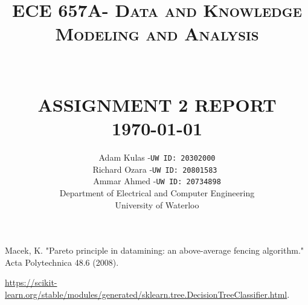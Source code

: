 \documentclass[ fontsize=11pt,twoside]{scrartcl}	%
\title{	\Large \textsc{ ECE 657A- Data and Knowledge Modeling and Analysis \\ } 
		 	\\[1.0cm]								%
			\HRule{2pt} \\					    	%
			\LARGE \textbf{\uppercase{Assignment 2 Report}}	%
			\HRule{2pt} \\ [0.5cm]		%
			\Large \today			    %
		}
\author{
		Adam Kulas -\texttt{UW ID: 20302000}\\	
        Richard Ozara -\texttt{UW ID: 20801583 } \\
        Ammar Ahmed -\texttt{UW ID: 20734898}\\
		Department of Electrical and Computer Engineering\\	
		University of Waterloo \\ 
}
\makeatletter
\def\printtitle{%
    {\centering \@title\par}}
\def\printauthor{%
    {\centering \Large \@author}}
\makeatother
\begin{document}
\thispagestyle{empty}		%
\printtitle 				%
  	\vfill
\printauthor				%
\newpage

\setcounter{page}{1}		%








%
%

\begin{thebibliography}{8}

Macek, K. "Pareto principle in datamining: an above-average fencing algorithm." Acta Polytechnica 48.6 (2008).


  \url{https://scikit-learn.org/stable/modules/generated/sklearn.tree.DecisionTreeClassifier.html}. 
\end{thebibliography}
\end{document}
